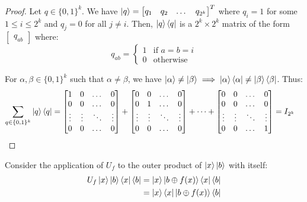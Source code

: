 \documentclass[12pt]{article}
\begin{document}
\begin{proof}
    Let $q \in \{0, 1\}^k$.
    We have $\ket{q} = \begin{bmatrix} q_1 & q_2 & \dots & q_{2^k} \end{bmatrix}^T$ where $q_i = 1$  for some $1 \le i \le 2^k$ and $q_j = 0$ for all $j \neq i$.
    Then, $\ket{q}\bra{q}$ is a $2^k \times 2^k$ matrix of the form$ \begin{bmatrix} q_{ab} \end{bmatrix}$ where:
    \[
        q_{ab} =
        \begin{cases}
            1 & \text{if } a = b = i \\
            0 & \text{otherwise}
        \end{cases}
    \]

    For $\alpha, \beta \in \{0,1\}^k$ such that $\alpha \neq \beta$, we have $\ket{\alpha} \neq \ket{\beta} \implies \ket{\alpha}\bra{\alpha} \neq \ket{\beta}\bra{\beta}$.
    Thus:
    \begin{align*}
        \sum_{q \in \{0,1\}^k}{\ket{q}\bra{q}} &=
            \begin{bmatrix}
                1 & 0 & \dots & 0 \\
                0 & 0 & \dots & 0 \\
                \vdots & \vdots & \ddots & \vdots \\
                0 & 0 & \dots & 0
            \end{bmatrix} +
            \begin{bmatrix}
                0 & 0 & \dots & 0 \\
                0 & 1 & \dots & 0 \\
                \vdots & \vdots & \ddots & \vdots \\
                0 & 0 & \dots & 0
            \end{bmatrix} + \dots + 
            \begin{bmatrix}
                0 & 0 & \dots & 0 \\
                0 & 0 & \dots & 0 \\
                \vdots & \vdots & \ddots & \vdots \\
                0 & 0 & \dots & 1
            \end{bmatrix} = I_{2^k}
    \end{align*}
\end{proof}

Consider the application of $U_f$ to the outer product of $\ket{x}\ket{b}$ with itself:
\begin{align*}
    U_f \ket{x}\ket{b}\bra{x}\bra{b} &= \ket{x}\ket{b \oplus f(x)} \bra{x}\bra{b} \\
                                     &= \ket{x}\bra{x} \ket{b \oplus f(x)}\bra{b} \\
\end{align*}
\end{document}
